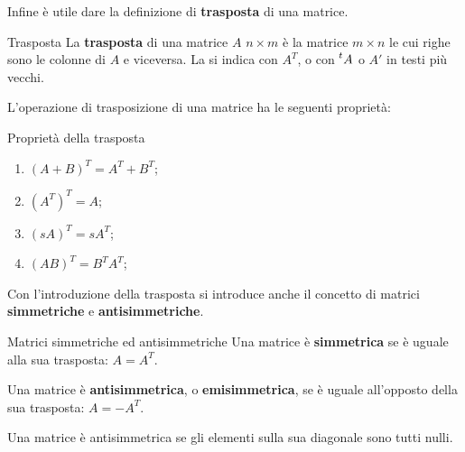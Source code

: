 Infine è utile dare la definizione di \textbf{trasposta} di una matrice.
\begin{newdef}{Trasposta}
    La \textbf{trasposta} di una matrice $A$ $n \times m$ è la matrice $m \times n$ le cui righe sono le colonne di $A$ e viceversa. La si indica con $A^T$, o con $\prescript{t}{}{A}$ o $A'$ in testi più vecchi.
\end{newdef}
L'operazione di trasposizione di una matrice ha le seguenti proprietà:
\begin{teo}{Proprietà della trasposta}
    \begin{enumerate}
        \item $(A + B)^T = A^T + B^T$;
        \item $(A^T)^T = A$;
        \item $(sA)^T = sA^T$;
        \item $(AB)^T = B^T A^T$;
    \end{enumerate}
\end{teo}
Con l'introduzione della trasposta si introduce anche il concetto di matrici \textbf{simmetriche} e \textbf{antisimmetriche}.
\begin{newdef}{Matrici simmetriche ed antisimmetriche}
    Una matrice è \textbf{simmetrica} se è uguale alla sua trasposta: $A = A^T$.

    Una matrice è \textbf{antisimmetrica}, o \textbf{emisimmetrica}, se è uguale all'opposto della sua trasposta: $A = -A^T$.
\end{newdef}
\begin{nb}
    Una matrice è antisimmetrica se gli elementi sulla sua diagonale sono tutti nulli.
\end{nb}
